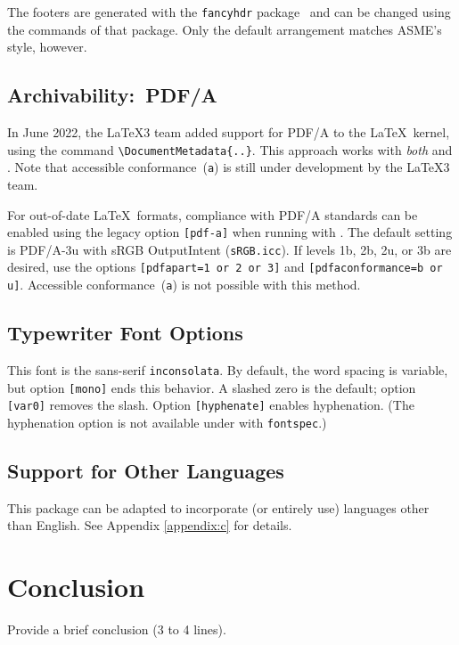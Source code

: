 \documentclass[captionpatch,colorlinks,upint,subscriptcorrection,varvw,german]{asmeconf}
\begin{document}
The footers are generated with the \texttt{fancyhdr} package~\cite{oostrum} and can be changed using the commands of that package. Only the default arrangement matches ASME's style, however.

\subsection{Archivability:~PDF/A} In June 2022, the \LaTeX 3 team added support for PDF/A to the \LaTeX\ kernel, using the command \verb|\DocumentMetadata{..}|. This approach works with \textit{both}  and . Note that accessible  conformance~(\texttt{a}) is still under development by the  \LaTeX3 team.

For out-of-date \LaTeX\ formats, compliance with PDF/A standards can be enabled using the legacy option \texttt{[pdf-a]} when running with . The default setting is PDF/A-3u with sRGB OutputIntent (\texttt{sRGB.icc}). If levels 1b, 2b, 2u, or 3b are desired, use the
options \texttt{[pdfapart=1 or 2 or 3]} and  \texttt{[pdfaconformance=b or u]}. Accessible  conformance~(\texttt{a}) is not possible with this method. 

\subsection{Typewriter Font Options} This font is the sans-serif \texttt{inconsolata}. By default, the word spacing is variable, but option \texttt{[mono]} ends this behavior. A slashed zero is the default; option \texttt{[var0]} removes the slash. Option \texttt{[hyphenate]} enables hyphenation. (The hyphenation option is not available under  with \texttt{fontspec}.)

\subsection{Support for Other Languages}  This package can be adapted to incorporate (or entirely use) languages other than English. See Appendix \ref{appendix:c} for details.



\section{Conclusion}
Provide a brief conclusion (3 to 4 lines).


\end{document}
